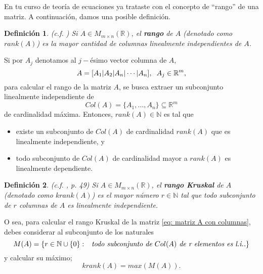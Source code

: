 \documentclass[10pt]{extreport}
\newcommand*{\IR}{\mathbb{R}}
\newcommand*{\IN}{\mathbb{N}}
\newtheorem{defi}{Definición}
\begin{document}
En tu curso de teoría de ecuaciones ya trataste con el concepto de 
``rango'' de una matriz. A continuación, damos una posible definición.

\begin{defi} (c.f. \cite{rank})
	Si $A \in M_{m \times n}(\IR)$, el \textbf{rango} de $A$ 
	(denotado como $rank(A)$)
	es
	la mayor cantidad de columnas linealmente independientes de $A$.
\end{defi}

Si por $A_{j}$ denotamos al $j-$ésimo vector columna de $A$,
\begin{equation}
	\label{eq: matriz A con columnas}
	A = [A_{1} | A_{2} | A_{n} | \cdots | A_{n}], \hspace{0.2cm}
	A_{j} \in \IR^{m},
\end{equation}
para calcular el rango de la matriz $A$, se busca extraer un subconjunto linealmente
independiente de 
\[
Col(A) = \{ A_{1}, \ldots , A_{n} \} \subseteq \IR^{m}
\]
de cardinalidad máxima. Entonces, $rank(A) \in \IN$ es tal que 
\begin{itemize}
	\item existe un subconjunto de $Col(A)$ de cardinalidad $rank(A)$ que es
	linealmente independiente, y 
	\item todo subconjunto de $Col(A)$ de cardinalidad mayor a $rank(A)$ 
	es linealmente dependiente.
\end{itemize}



\begin{defi}
	(c.f. \cite{highDimDA}, p. 49)
	Si $A \in M_{m \times n}(\IR)$, el \textbf{rango Kruskal} de $A$ 
	(denotado como $krank(A)$)
	es el mayor número
	$r \in \IN$ tal que \textit{todo} subconjunto de $r$ 
	columnas de $A$ es linealmente independiente.
\end{defi}
O sea, para calcular el rango Kruskal de la matriz
\eqref{eq: matriz A con columnas}, debes considerar al subconjunto de los naturales
\[
M(A) = \{ r \in \IN \cup \{0\} : \hspace{0.15cm} \textit{ todo subconjunto de } Col(A) \textit{ de
r elementos es l.i..} \}
\]
y calcular su máximo;
\[
krank(A) = max (M(A)).
\]
\end{document}

